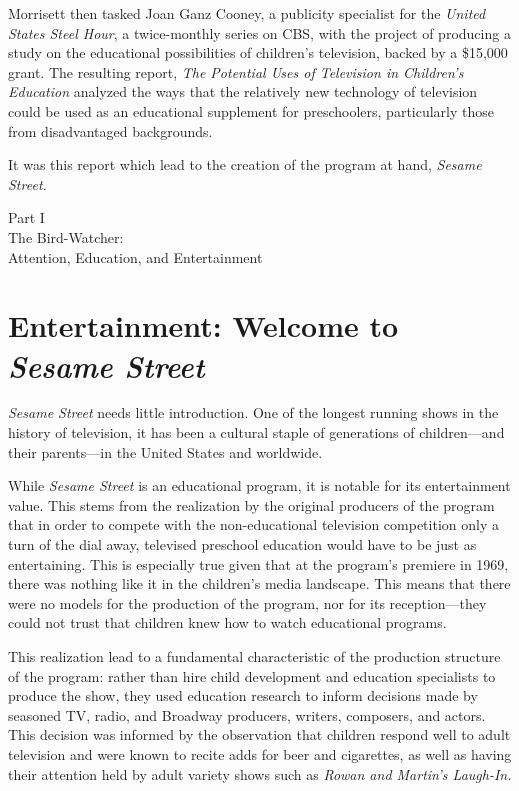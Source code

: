\documentclass[12pt,letterpaper]{article}
\begin{document}
	Morrisett then tasked Joan Ganz Cooney, a publicity specialist for the 
	\textit{United States Steel Hour}, a twice-monthly series on CBS, 
	\autocite[27]{Davis} with the project of producing a study
	on the educational possibilities of children's television, backed by a
	\$15,000 grant. The resulting report, \textit{The Potential Uses of 
	Television in Children's Education} analyzed the ways that the
	relatively new technology of television could be used as an educational
	supplement for preschoolers, particularly those from disadvantaged 
	backgrounds.

	It was this report which lead to the creation of the program at hand, 
	\textit{Sesame Street.}


	\newpage
	\thispagestyle{empty}
	\vspace*{30pt}
	\begin{center}
	{\Huge Part I\\ 
	\Large The Bird-Watcher:\\
	Attention, Education, and Entertainment}
	\end{center}
	\newpage

	\section*{Entertainment: Welcome to \textit{Sesame Street}}

	\noindent\textit{Sesame Street} needs little introduction. One of the
	longest
	running shows in the history of television,\autocite{Brit} it has been a 
	cultural staple of generations of children---and their parents---in the 
	United States and worldwide.
	
	While \textit{Sesame Street} is an educational program, it is notable 
	for its entertainment value. This stems from the realization by the 
	original producers of the program that in order to compete with the 
	non-educational television competition only a turn of the dial away,
	televised preschool education would have to be just as 
	entertaining.\autocite[38]{Cooney} This is especially true given that
	at the program's premiere in 1969, there was nothing like it in the 
	children's media landscape.\autocite[See chapter 3 for a survey of the 
	contemporary children's television landscape]{Davis} This means that 
	there were no models for the production of the program, nor for its
	reception---they could not trust that children knew how to watch
	educational programs.  

	This realization lead to a fundamental characteristic of the production
	structure of the program: rather than hire child development and 
	education specialists to produce the show, they used education research
	to inform decisions made by seasoned TV, radio, and Broadway producers,
	writers, composers, and actors. This decision was informed by the 
	observation
	that children respond well to adult television and were known to recite
	adds for beer and cigarettes, as well as having their attention held by
	adult variety shows such as \textit{Rowan and Martin's Laugh-In.}
	\autocite[16]{Ostrofsky2012}
\end{document}
